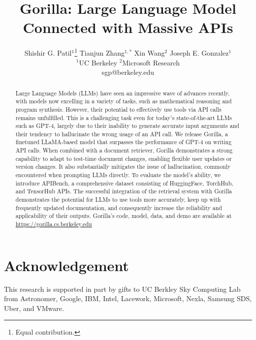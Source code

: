\documentclass{article}
\title{Gorilla: Large Language Model Connected with Massive APIs}
\author{%
  Shishir G. Patil$^{1}$\thanks{Equal contribution.} \quad Tianjun Zhang$^{1,*}$ \quad Xin Wang$^{2}$ \quad  Joseph E. Gonzalez$^{1}$ \\
$^1$UC Berkeley \qquad $^2$Microsoft Research \\
sgp@berkeley.edu
}
\begin{document}
\maketitle


\begin{abstract}
  Large Language Models (LLMs) have seen an impressive wave of advances recently, with models now excelling in a variety of tasks, such as mathematical reasoning and program synthesis. However, their potential to effectively use tools via API calls remains unfulfilled. This is a challenging task even for today's state-of-the-art LLMs such as GPT-4, largely due to their inability to generate accurate input arguments and their tendency to hallucinate the wrong usage of an API call. We release Gorilla, a finetuned LLaMA-based model that surpasses the performance of GPT-4 on writing API calls. When combined with a document retriever, Gorilla demonstrates a strong capability to adapt to test-time document changes, enabling flexible user updates or version changes. It also substantially mitigates the issue of hallucination, commonly encountered when prompting LLMs directly. To evaluate the model's ability, we introduce APIBench, a comprehensive dataset consisting of HuggingFace, TorchHub, and TensorHub APIs. The successful integration of the retrieval system with Gorilla demonstrates the potential for LLMs to use tools more accurately, keep up with frequently updated documentation, and consequently increase the reliability and applicability of their outputs.
  Gorilla's code, model, data, and demo are available at \url{https://gorilla.cs.berkeley.edu}
\end{abstract}







\section{Acknowledgement}
\label{sec:ack}
This research is supported in part by gifts to UC Berkley Sky Computing Lab from Astronomer, Google, IBM, Intel, Lacework, Microsoft, Nexla, Samsung SDS, Uber, and VMware.





\newpage


\end{document}
